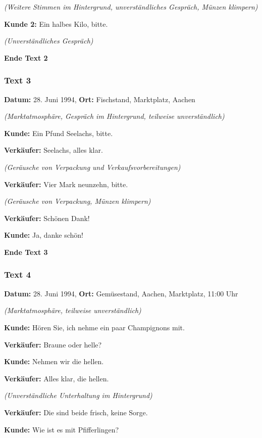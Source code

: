 \documentclass[
]{article}
\begin{document}
\emph{(Weitere Stimmen im Hintergrund, unverständliches Gespräch, Münzen
klimpern)}

\textbf{Kunde 2:} Ein halbes Kilo, bitte.

\emph{(Unverständliches Gespräch)}

\textbf{Ende Text 2}

\subsubsection{\texorpdfstring{\textbf{Text 3}}{Text 3}}\label{text-3}

\textbf{Datum:} 28. Juni 1994, \textbf{Ort:} Fischstand, Marktplatz,
Aachen

\emph{(Marktatmosphäre, Gespräch im Hintergrund, teilweise
unverständlich)}

\textbf{Kunde:} Ein Pfund Seelachs, bitte.

\textbf{Verkäufer:} Seelachs, alles klar.

\emph{(Geräusche von Verpackung und Verkaufsvorbereitungen)}

\textbf{Verkäufer:} Vier Mark neunzehn, bitte.

\emph{(Geräusche von Verpackung, Münzen klimpern)}

\textbf{Verkäufer:} Schönen Dank!

\textbf{Kunde:} Ja, danke schön!

\textbf{Ende Text 3}

\subsubsection{\texorpdfstring{\textbf{Text 4}}{Text 4}}\label{text-4}

\textbf{Datum:} 28. Juni 1994, \textbf{Ort:} Gemüsestand, Aachen,
Marktplatz, 11:00 Uhr

\emph{(Marktatmosphäre, teilweise unverständlich)}

\textbf{Kunde:} Hören Sie, ich nehme ein paar Champignons mit.

\textbf{Verkäufer:} Braune oder helle?

\textbf{Kunde:} Nehmen wir die hellen.

\textbf{Verkäufer:} Alles klar, die hellen.

\emph{(Unverständliche Unterhaltung im Hintergrund)}

\textbf{Verkäufer:} Die sind beide frisch, keine Sorge.

\textbf{Kunde:} Wie ist es mit Pfifferlingen?
\end{document}
